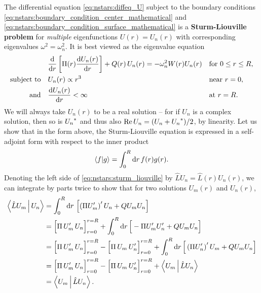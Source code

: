 The differential equation \eqref{eq:nstars:diffeq_U} subject to the boundary conditions \eqref{eq:nstars:boundary_condition_center_mathematical} and \eqref{eq:nstars:boundary_condition_surface_mathematical} is a \textbf{Sturm-Liouville problem} for \emph{multiple} eigenfunctions $U(r) = U_n(r)$ with corresponding eigenvalues $\omega^2 = \omega_n^2$.
It is best viewed as the eigenvalue equation
\begin{subequations}
\begin{align}
	&\odv*{ \left[ \Pi(r) \odv{U_n(r)}{r} \right] }{r} + Q(r) \, U_n(r) = -\omega_n^2 W(r) U_n(r) && \text{for } 0 \leq r \leq R , \label{eq:nstars:sturm_liouville} \\
	\text{subject to} \quad & U_n(r)          \propto r^3    && \text{near } r=0 , \label{eq:nstars:sturm_liouville_boundary_condition1} \\
	\text{and}        \quad & \odv{U_n(r)}{r} <       \infty && \text{at } r=R . \label{eq:nstars:sturm_liouville_boundary_condition2}
\end{align}%
\label{eq:nstars:sturm_liouville_problem}%
\end{subequations}
We will always take $U_n(r)$ to be a real solution -- for if $U_n$ is a complex solution, then so is ${U_n}^*$ and thus also $\operatorname{Re}{U_n} = (U_n + {U_n}^*)/2$, by linearity.
Let us show that in the form above, the Sturm-Liouville equation is expressed in a self-adjoint form with respect to the inner product
\begin{equation}
	\braket{f | g} = \int_0^R \mathop{}\!\mathrm{d} r \, f(r) g(r) .
\label{eq:nstars:function_inner_product}
\end{equation}
Denoting the left side of \cref{eq:nstars:sturm_liouville} by $\hat{L} U_n = \hat{L}(r) U_n(r)$, we can integrate by parts twice to show that for two solutions $U_m(r)$ and $U_n(r)$,
\begin{equation}
\begin{split}
	\Braket{\hat{L} U_m | U_n} &= \int_0^R \mathop{}\!\mathrm{d} r \, \left[ \left( \Pi U_m' \right)' U_n + Q U_m U_n \right] \\
	                           &= \Big[ \Pi \, U_m' \, U_n \Big]_{r=0}^{r=R} + \int_0^R \mathop{}\!\mathrm{d} r \, \Big[ - \Pi U_m' U_n' + Q U_m U_n \Big] \\
	                           &= \Big[ \Pi \, U_m' \, U_n \Big]_{r=0}^{r=R} - \Big[ \Pi \, U_m \, U_n' \Big]_{r=0}^{r=R} + \int_0^R \mathop{}\!\mathrm{d} r \, \Big[ \left( \Pi U_n' \right)' U_m + Q U_m U_n \Big] \\
	                           &= \Big[ \Pi \, U_m' \, U_n \Big]_{r=0}^{r=R} - \Big[ \Pi \, U_m \, U_n' \Big]_{r=0}^{r=R} + \Braket{U_m | \hat{L} U_n} \\
	                           &= \Braket{U_m | \hat{L} U_n} .
\label{eq:nstars:inner_product_hermitean}
\end{split}
\end{equation}

